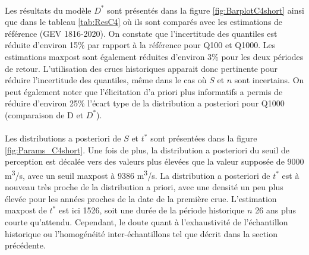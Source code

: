 \documentclass[11pt]{article}
\begin{document}
	\paragraph{} Les résultats du modèle $D^*$ sont présentés dans la figure \ref{fig:BarplotC4short} ainsi que dans le tableau \ref{tab:ResC4} où ils sont comparés avec les estimations de référence (GEV 1816-2020). On constate que l'incertitude des quantiles est réduite d'environ 15\% par rapport à la référence pour Q100 et Q1000. Les estimations maxpost sont également réduites d'environ 3\% pour les deux périodes de retour. L'utilisation des crues historiques apparait donc pertinente pour réduire l'incertitude des quantiles, même dans le cas où $S$ et $n$ sont incertains. On peut également noter que l'élicitation d'a priori plus informatifs a permis de réduire d'environ 25\% l'écart type de la distribution a posteriori pour Q1000 (comparaison de D et $D^*$). 

%
%
		
	\paragraph{} Les distributions a posteriori de $S$ et $t^{*}$ sont présentées dans la figure \ref{fig:Params_C4short}. Une fois de plus, la distribution a posteriori du seuil de perception est décalée vers des valeurs plus élevées que la valeur supposée de 9000 m\textsuperscript{3}/s, avec un seuil maxpost à 9386 m\textsuperscript{3}/s. La distribution a posteriori de $t^{*}$ est à nouveau très proche de la distribution a priori, avec une densité un peu plus élevée pour les années proches de la date de la première crue. L'estimation maxpost de $t^{*}$ est ici 1526, soit une durée de la période historique $n$ 26 ans plus courte qu'attendu. Cependant, le doute quant à l'exhaustivité de l'échantillon historique ou l'homogénéité inter-échantillons tel que décrit dans la section précédente.
			
\end{document}
